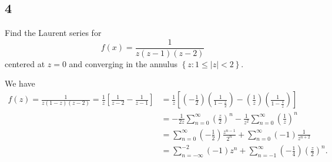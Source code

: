 \documentclass[12pt]{article}
\begin{document}
\newpage
\subsection*{4}
\begin{tcolorbox}
Find the Laurent series for 
\[ f(x) = \frac{1}{z(z-1)(z-2)} \]
centered at $z = 0$ and converging in the annulus $\left\{ z : 1 \leq |z| < 2 \right\}$.
\end{tcolorbox}
We have 
\begin{align*}
f(z) = \frac{1}{z(1-z)(z-2)} = \frac{1}{z}\left[ \frac{1}{z - 2} - \frac{1}{z - 1} \right] & = \frac{1}{z}\left[ 
\left( -\frac{1}{2}\right)\left( \frac{1}{1 - \frac{z}{2}} \right)  - \left( \frac{1}{z} \right)\left( \frac{1}{1 - \frac{1}{z}} \right) \right] \\
& = -\frac{1}{2z}\sum_{n=0}^{\infty}\left( \frac{z}{2} \right)^{n} - \frac{1}{z^{2}}\sum_{n=0}^{\infty}\left( \frac{1}{z} \right)^{n} \\
& = \sum_{n=0}^{\infty}\left( -\frac{1}{2} \right)\frac{z^{n-1}}{2^{n}} + \sum_{n=0}^{\infty}(-1)\frac{1}{z^{n+2}} \\
& = \sum_{n=-\infty}^{-2}(-1)z^{n} + \sum_{n=-1}^{\infty}\left( -\frac{1}{4} \right)\left( \frac{z}{2} \right)^{n}.
\end{align*}

\newpage
\end{document}
